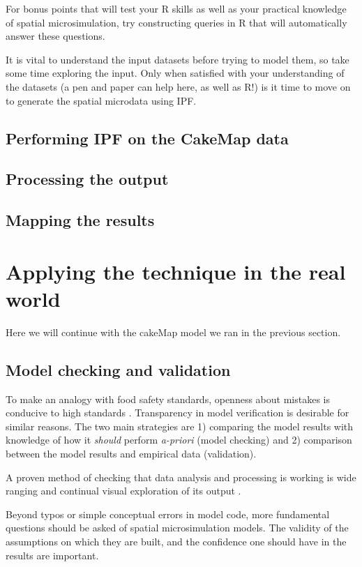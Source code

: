 \documentclass[a4paper, 11pt, twoside]{article}
\begin{document}
For bonus points that will test your R skills as well as your practical knowledge
of spatial microsimulation, try constructing queries in R that will automatically
answer these questions.

It is vital to understand the input datasets before trying to model them, so
take some time exploring the input. Only when satisfied with your understanding of
the datasets (a pen and paper can help here, as well as R!) is it time
to move on to generate the spatial microdata using IPF.

\subsection{Performing IPF on the CakeMap data}

\subsection{Processing the output}

\subsection{Mapping the results}
\section{Applying the technique in the real world} \label{smeval}
Here we will continue with the cakeMap model we ran in the previous section.

\subsection{Model checking and validation}
To make an analogy with food safety standards, openness about mistakes is
conducive to high standards \citep{Powell2011}. Transparency in model
verification is desirable for similar reasons. The two main strategies are 1) 
comparing the model results with knowledge of how it \emph{should}
perform \emph{a-priori} (model checking) and 2) comparison between the model
results and empirical data (validation).

A proven method of checking that data analysis and processing is working
is wide ranging and continual visual exploration of its output
\citep{janert2010data}.

Beyond typos or simple conceptual errors in model code, more fundamental
questions should be asked of spatial microsimulation models. The validity
of the assumptions on which they are built, and the confidence one should have
in the results are important.
\end{document}
